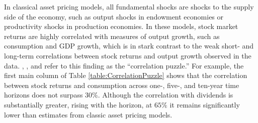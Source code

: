\documentclass[preprint,11pt,authoryear]{elsarticle}
\theoremstyle{plain}
\begin{document}
In classical asset pricing models, all fundamental shocks
 are shocks to the supply side of the economy, such as output shocks in \cite{Lucas1978} endowment economies or productivity shocks in \cite{Jermann1998} production economies. In these models, stock market returns are highly correlated with measures of output growth, such as consumption and GDP growth, which is in stark contrast to the weak short- and long-term correlations between stock returns and output growth observed in the data. \cite{CochraneHansen1992}, \cite{campbell-cochrane:99}, and \cite{Cochrane2005} refer to this finding as the ``correlation puzzle.'' For example, the first main column of Table \ref{table:CorrelationPuzzle} shows that the correlation between stock returns and consumption across one-, five-, and ten-year time horizons does not surpass $30\%$. Although the correlation with dividends is substantially greater, rising with the horizon, at $65\%$ it remains significantly lower than estimates from classic asset pricing models. 
 
\end{document}
